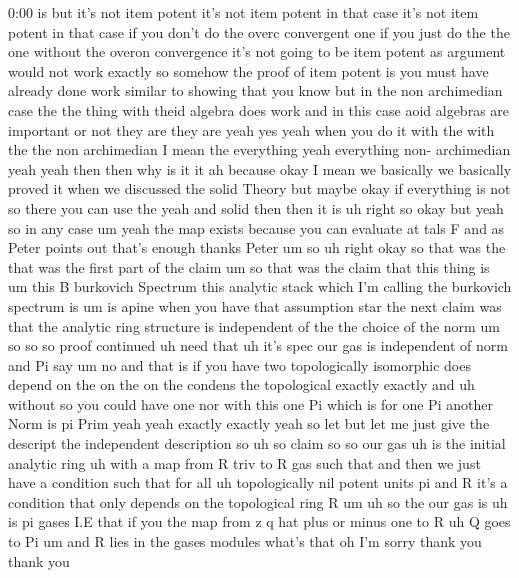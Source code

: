 \begin{unfinished}{0:00}
is  but  it's  not  item  potent  it's  not
item  potent  in  that  case  it's  not  item
potent  in  that  case  if  you  don't  do  the
overc  convergent  one  if  you  just  do  the
the  one  without  the  overon  convergence
it's  not  going  to  be  item  potent  as
argument  would  not  work  exactly  so
somehow  the  proof  of  item  potent  is  you
must  have  already  done  work  similar  to
showing  that  you
know  but  in  the  non  archimedian  case  the
the  thing  with  theid  algebra  does  work
and  in  this  case  aoid  algebras  are
important  or  not  they  are  they  are  yeah
yes  yeah  when  you  do  it  with  the  with
the  the  non  archimedian  I  mean  the
everything  yeah  everything  non-
archimedian  yeah  yeah  then  then  why  is
it  it  ah  because  okay  I  mean  we
basically  we  basically  proved  it  when  we
discussed  the  solid  Theory  but  maybe
okay  if  everything  is  not  so  there  you
can  use  the  yeah  and  solid
then  then  it
is  uh  right  so  okay  but  yeah  so  in  any
case  um  yeah  the  map  exists  because  you
can  evaluate  at  tals  F  and  as  Peter
points  out  that's  enough  thanks  Peter  um
so  uh  right  okay  so  that  was  the  that
was  the  first  part  of  the
claim
um  so  that  was  the  claim  that  this  thing
is  um  this  B  burkovich  Spectrum  this
analytic  stack  which  I'm  calling  the
burkovich  spectrum  is  um  is  apine  when
you  have  that  assumption
star  the  next  claim  was  that  the
analytic  ring  structure  is  independent
of  the  the  choice  of  the  norm  um  so  so
so  proof
continued  uh  need  that  uh  it's  spec  our
gas  is
independent  of  norm  and  Pi
say
um  no  and  that  is  if  you  have  two
topologically
isomorphic  does  depend  on  the  on  the  on
the  condens  the  topological  exactly
exactly  and
uh  without  so  you  could  have  one  nor
with  this  one  Pi  which  is  for  one  Pi
another  Norm  is  pi  Prim  yeah  yeah
exactly  exactly  yeah  so  let  but  let  me
just  give  the  descript  the  independent
description  so  uh  so
claim  so  so  our  gas  uh  is  the  initial
analytic
ring  uh  with  a  map
from  R
triv  to  R
gas  such  that  and  then  we  just  have  a
condition  such  that  for  all  uh
topologically  nil  potent
units  pi  and  R  it's  a  condition  that
only  depends  on  the  topological  ring  R
um  uh  so
the  our  gas  is  uh  is  pi
gases
I.E  that  if  you  the  map  from  z  q  hat
plus  or  minus  one  to  R  uh  Q  goes  to  Pi
um  and  R  lies  in
the  gases
modules  what's
that  oh  I'm  sorry  thank  you  thank  you

\end{unfinished}
